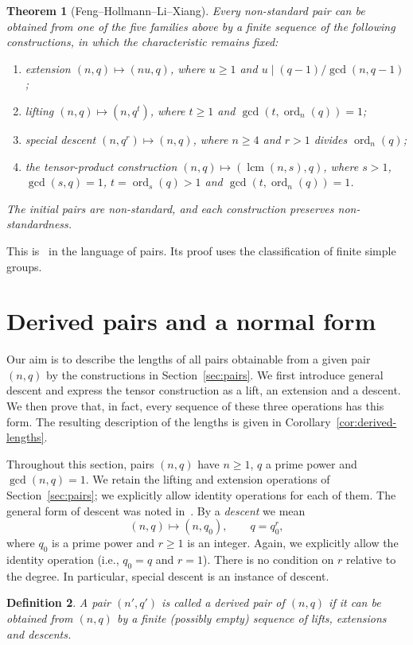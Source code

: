 \documentclass[11pt]{article}
\newtheorem{teor}{Theorem}[section]
\newtheorem{defi}[teor]{Definition}
\newcommand{\btmn}[2]{\begin{teor}[#1] \label{#2}}
\newcommand{\etmn}{\end{teor}}
\DeclareMathOperator{\ord}{ord}
\DeclareMathOperator{\lcm}{lcm}
\begin{document}
\btmn{Feng--Hollmann--Li--Xiang}{thm:classification}
Every non-standard pair can be obtained from one of the five families
above by a finite sequence of the following constructions, in which
the characteristic remains fixed:
\begin{enumerate}
\item[\rm (i)] extension $(n,q)\mapsto(nu,q)$, where $u\ge1$ and
$u\mid(q-1)/\gcd(n,q-1)$;
\item[\rm (ii)] lifting $(n,q)\mapsto(n,q^t)$, where $t\ge1$ and
$\gcd(t,\ord_n(q))=1$;
\item[\rm (iii)] special descent $(n,q^r)\mapsto(n,q)$, where
$n\ge4$ and $r>1$ divides $\ord_n(q)$;
\item[\rm (iv)] the tensor-product construction
$(n,q)\mapsto(\lcm(n,s),q)$, where $s>1$, $\gcd(s,q)=1$,
$t=\ord_s(q)>1$ and $\gcd(t,\ord_n(q))=1$.
\end{enumerate}
The initial pairs are non-standard, and each construction preserves
non-standardness.
\etmn

This is~\cite[Theorem 1.1 and Section 3]{FHLX} in the language of
pairs. Its proof uses the classification of finite simple groups.


\section{Derived pairs and a normal form}\label{sec:derived}
%
Our aim is to describe the lengths of all pairs obtainable from a given
pair $(n,q)$ by the constructions in Section~\ref{sec:pairs}.
We first introduce general descent and express the tensor construction
as a lift, an extension and a descent. We then prove that, in fact, every sequence
of these three operations has this form. The resulting description of
the lengths is given in Corollary~\ref{cor:derived-lengths}.

Throughout this section, pairs $(n,q)$ have $n\ge1$, $q$ a prime power
and $\gcd(n,q)=1$. We retain the lifting and extension operations of
Section~\ref{sec:pairs}; we explicitly allow identity operations for each of them. The general form of descent
was noted in~\cite[Remark 3.12]{FHLX}. By a \emph{descent} we mean
\[
 (n,q)\longmapsto(n,q_0),\qquad q=q_0^r,
\]
where $q_0$ is a prime power and $r\ge1$ is an integer. Again, we explicitly allow the identity operation (i.e., $q_0=q$ and $r=1$). There is no
condition on $r$ relative to the degree. In particular, special descent
is an instance of descent. 
%
\begin{defi}\label{def:derived}
A pair $(n',q')$ is called a \emph{derived pair} of $(n,q)$
if it can be obtained from $(n,q)$ by a finite (possibly empty) sequence of
lifts, extensions and descents.
\end{defi}
%
\end{document}
